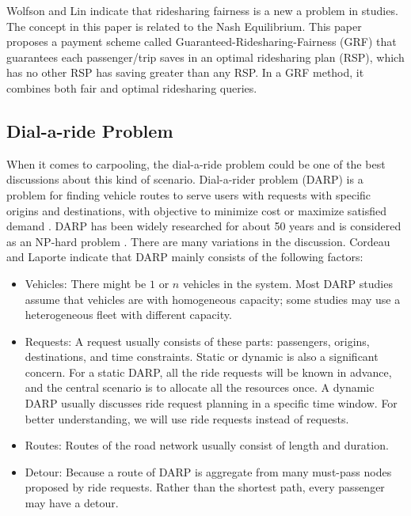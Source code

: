 Wolfson and Lin \cite{wolfson_fairness_2017} indicate that ridesharing fairness is a new a problem in studies. The concept in this paper is related to the Nash Equilibrium. This paper proposes a payment scheme called Guaranteed-Ridesharing-Fairness (GRF) that guarantees each passenger/trip saves in an optimal ridesharing plan (RSP), which has no other RSP has saving greater than any RSP. In a GRF method, it combines both fair and optimal ridesharing queries.

\subsection{Dial-a-ride Problem}

When it comes to carpooling, the dial-a-ride problem could be one of the best discussions about this kind of scenario. Dial-a-rider problem (DARP) is a problem for finding vehicle routes to serve users with requests with specific origins and destinations, with objective to minimize cost or maximize satisfied demand \cite{cordeau_dialaride_2007}. DARP has been widely researched for about 50 years \cite{wilson_scheduling_1971} and is considered as an NP-hard problem \cite{cordeau_branchandcut_2006}. There are many variations in the discussion. Cordeau and Laporte \cite{cordeau_dialaride_2007} indicate that DARP mainly consists of the following factors:

\begin{itemize}
  \item Vehicles: There might be $1$ or $n$ vehicles in the system. Most DARP studies assume that vehicles are with homogeneous capacity; some studies may use a heterogeneous fleet with different capacity.
  \item Requests: A request usually consists of these parts: passengers, origins, destinations, and time constraints. Static or dynamic is also a significant concern. For a static DARP, all the ride requests will be known in advance, and the central scenario is to allocate all the resources once. A dynamic DARP usually discusses ride request planning in a specific time window. For better understanding, we will use ride requests instead of requests.
  \item Routes: Routes of the road network usually consist of length and duration.
  \item Detour: Because a route of DARP is aggregate from many must-pass nodes proposed by ride requests. Rather than the shortest path, every passenger may have a detour.
\end{itemize}

